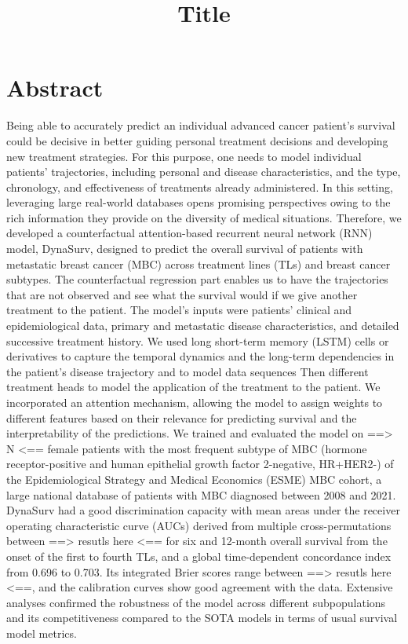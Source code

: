 \documentclass[a4paper,10pt]{article}
\title{Title}
\date{}
\begin{document}
\maketitle

\section*{Abstract}
Being able to accurately predict an individual advanced cancer patient's survival could be decisive in better guiding personal treatment decisions and developing new treatment strategies. For this purpose, one needs to model individual patients' trajectories, including personal and disease characteristics, and the type, chronology, and effectiveness of treatments already administered.
In this setting, leveraging large real-world databases opens promising perspectives owing to the rich information they provide on the diversity of medical situations. Therefore, we developed a counterfactual attention-based recurrent neural network (RNN) model, DynaSurv, designed to predict the overall survival of patients with metastatic breast cancer (MBC) across treatment lines (TLs) and breast cancer subtypes. The counterfactual regression part enables us to have the trajectories that are not observed and see what the survival would if we give another treatment to the patient. The model's inputs were patients' clinical and epidemiological data, primary and metastatic disease characteristics, and detailed successive treatment history.
We used long short-term memory (LSTM) cells or derivatives to capture the temporal dynamics and the long-term dependencies in the patient's disease trajectory and to model data sequences Then different treatment heads to model the application of the treatment to the patient. We incorporated an attention mechanism, allowing the model to assign weights to different features based on their relevance for predicting survival and the interpretability of the predictions.
We trained and evaluated the model on ==> N <== female patients with the most frequent subtype of MBC (hormone receptor-positive and human epithelial growth factor 2-negative, HR+HER2-) of the Epidemiological Strategy and Medical Economics (ESME) MBC cohort, a large national database of patients with MBC diagnosed between 2008 and 2021.
DynaSurv had a good discrimination capacity with mean areas under the receiver operating characteristic curve (AUCs) derived from multiple cross-permutations between ==> resutls here <== for six and 12-month overall survival from the onset of the first to fourth TLs, and a global time-dependent concordance index from 0.696 to 0.703.
Its integrated Brier scores range between ==> resutls here <==, and the calibration curves show good agreement with the data. Extensive analyses confirmed the robustness of the model across different subpopulations and its competitiveness compared to the SOTA models in terms of usual survival model metrics.
\end{document}
